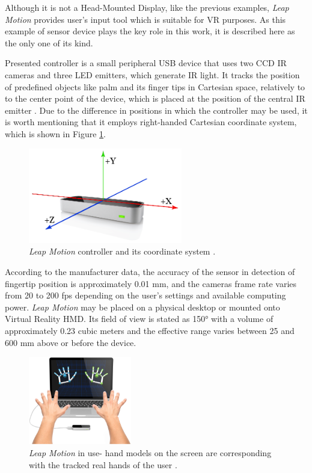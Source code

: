Although it is not a Head-Mounted Display, like the previous examples, \textit{Leap Motion} provides user's input tool which is suitable for VR purposes. As this example of sensor device plays the key role in this work, it is described here as the only one of its kind.

Presented controller is a small peripheral USB device that uses two CCD IR cameras and three LED emitters, which generate IR light.  It tracks the position of predefined objects like palm and its finger tips in Cartesian space, relatively to to the center point of the device, which is placed at the position of the central IR emitter \cite{Weichert13}. Due to the difference in positions in which the controller may be used, it is worth mentioning that it employs right-handed Cartesian coordinate system, which is shown in Figure \ref{fig:leapCoordinates}.

\begin{figure}[h] 
\centering    
\includegraphics[width=0.6\textwidth]{Figs/leapCoordinates.png}
\caption{\textit{Leap Motion} controller and its coordinate system \cite{Leap16}.}
\label{fig:leapCoordinates}
\end{figure}

 According to the manufacturer data, the accuracy of the sensor in detection of fingertip position is approximately 0.01 mm, and the cameras frame rate varies from 20 to 200 fps depending on the user's settings and available computing power. \textit{Leap Motion} may be placed on a physical desktop or mounted onto Virtual Reality HMD. Its field of view is stated as 150° with a volume of approximately 0.23 cubic meters and the effective range varies between 25 and 600 mm above or before the device. 

 
\begin{figure}[h] 
\centering    
\includegraphics[width=0.4\textwidth]{Figs/leapmotion.jpg}
\caption{\textit{Leap Motion} in use- hand models on the screen are corresponding with the tracked real hands of the user \cite{Leap16}.}
\label{fig:leapmotion}
\end{figure}

